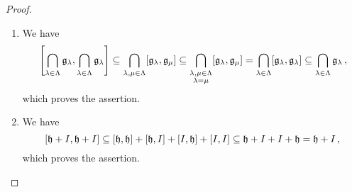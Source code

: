 \begin{proof}
	\leavevmode
	\begin{enumerate}
		\item
			We have
			\[
				\left[
					\bigcap_{\lambda \in \Lambda} \mathfrak{g}_\lambda,
					\bigcap_{\lambda \in \Lambda} \mathfrak{g}_\lambda
				\right]
				\subseteq
				\bigcap_{\lambda, \mu \in \Lambda}
				[\mathfrak{g}_\lambda, \mathfrak{g}_\mu]
				\subseteq
				\bigcap_{\substack{\lambda, \mu \in \Lambda \\ \lambda = \mu}}
				[\mathfrak{g}_\lambda, \mathfrak{g}_\mu]
				=
				\bigcap_{\lambda \in \Lambda}
				[\mathfrak{g}_\lambda, \mathfrak{g}_\lambda]
				\subseteq
				\bigcap_{\lambda \in \Lambda}
				\mathfrak{g}_\lambda \,,
			\]
			which proves the assertion.
		\item
			We have
			\[
				[\mathfrak{h} + I, \mathfrak{h} + I]
				\subseteq
				[\mathfrak{h}, \mathfrak{h}] + [\mathfrak{h}, I] + [I, \mathfrak{h}] + [I, I]
				\subseteq
				\mathfrak{h} + I + I + \mathfrak{h}
				=
				\mathfrak{h} + I \,,
			\]
			which proves the assertion.
		\qedhere
	\end{enumerate}
\end{proof}


